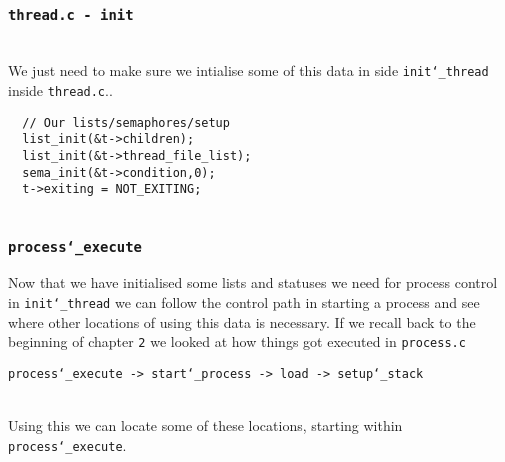 \documentclass[]{article}
\begin{document}
 \subsubsection{\texttt{thread.c - init}}
		   
		 \textbf{}\\
		 We just need to make sure we intialise some of this data in side \texttt{init\char`_thread} inside \texttt{thread.c}..
		 
		  			\lstset{language=C, tabsize=2}  
		    \begin{lstlisting} 
  // Our lists/semaphores/setup
  list_init(&t->children);
  list_init(&t->thread_file_list);
  sema_init(&t->condition,0);
  t->exiting = NOT_EXITING;


 \end{lstlisting}
 \newpage
 
  \subsubsection{\texttt{process\char`_execute}}

Now that we have initialised some lists and statuses we need for process control in \texttt{init\char`_thread} we can follow the control path in starting a process and see where other locations of using this data is necessary. If we recall back to the beginning of chapter \texttt{2} we looked at how things got executed in \texttt{process.c}\\

	 \centerline{\texttt{process\char`_execute -> start\char`_process -> load -> setup\char`_stack}} 
	 
	 \texttt{}\\ Using this we can locate some of these locations, starting within \texttt{process\char`_execute}.
\end{document}
